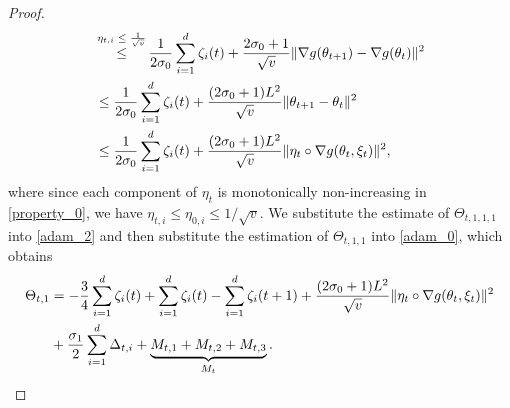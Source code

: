 \documentclass[standalone]{article}
\begin{document}
\begin{proof}
\begin{align*}
&\mathop{\le}^{\text{$\eta_{t,i}\le \frac{1}{\sqrt{v}}$}}
 \frac{1}{2\sigma_{0}}\sum_{i=1}^{d}\zeta_{i}(t)+\frac{2\sigma_{0}+1}{\sqrt{v}}\|\nabla g(\theta_{t+1})-\nabla g(\theta_{t})\|^{2}\notag\\&\le\frac{1}{2\sigma_{0}}\sum_{i=1}^{d}\zeta_{i}(t)+\frac{(2\sigma_{0}+1) L^{2}}{\sqrt{v}}\|\theta_{t+1}-\theta_{t}\|^{2}\notag\\&\le \frac{1}{2\sigma_{0}}\sum_{i=1}^{d}\zeta_{i}(t)+\frac{(2\sigma_{0}+1) L^{2}}{\sqrt{v}}\|\eta_t\circ \nabla g(\theta_{t},\xi_{t})\|^{2}\notag,
\end{align*}
where since each component of $\eta_{t}$ is monotonically non-increasing in \cref{property_0}, we have $\eta_{t,i} \leq \eta_{0,i} \leq 1/\sqrt{v}$. 
We substitute the estimate of $\Theta_{t,1,1,1}$ into \cref{adam_2} and then substitute the estimation of $\Theta_{t,1,1}$ into \cref{adam_0}, which obtains
\begin{align}\label{adam_3}
\Theta_{t,1}&=-\frac{3}{4}\sum_{i=1}^{d}\zeta_{i}(t)+\sum_{i=1}^{d}\zeta_{i}(t)-\sum_{i=1}^{d}\zeta_{i}(t+1)+\frac{(2\sigma_{0}+1) L^{2}}{\sqrt{v}}\|\eta_t\circ \nabla g(\theta_{t},\xi_{t})\|^{2}\notag\\&+\frac{\sigma_{1}}{2}\sum_{i=1}^{d}\Delta_{t,i}+\underbrace{M_{t,1}+M_{t,2}+M_{t,3}}_{M_{t}}.
\end{align}

\end{proof}
\end{document}
